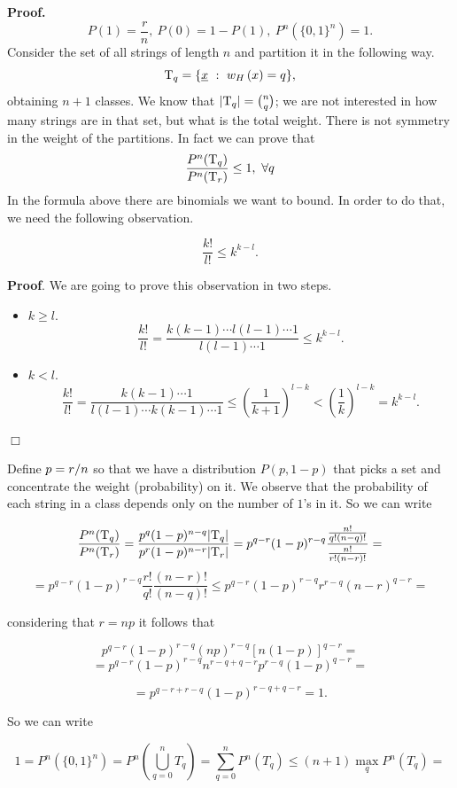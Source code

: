 \noindent\textbf{Proof.} $$P(1) = \dfrac{r}{n},\ P(0) = 1 - P(1),\ P^n(\{0, 1\}^n) = 1.$$
Consider the set of all strings of length $n$ and partition it in the following way.
$$\mathrm{T}_q = \{\underline{x}\ :\ w_H\left(x\right) = q\},$$
obtaining $n +1$ classes. 
We know that $|\mathrm{T}_q| = \binom{n}{q}$; we are not interested in how many strings are in that set, but what is the total weight.
There is not symmetry in the weight of the partitions. In fact we can prove that
$$ \dfrac{P^n(\mathrm{T}_q)}{P^n(\mathrm{T}_r)} \leq 1,\ \forall q$$
In the formula above there are binomials we want to bound. In order to do that, we need the following observation.

\begin{obs}
	$$\dfrac{k!}{l!} \leq k^{k-l}.$$
\end{obs}

\noindent\textbf{Proof}. We are going to prove this observation in two steps.
\begin{itemize}
	\item $k \geq l$. 
	$$\dfrac{k!}{l!} = \dfrac{k(k-1) \cdots l(l -1) \cdots 1}{l(l -1) \cdots 1} \leq k^{k-l}.$$
	
	\item $k < l$.
	$$\dfrac{k!}{l!} = \dfrac{k(k-1) \cdots 1}{l(l -1) \cdots k(k-1) \cdots 1} \leq \left(\dfrac{1}{k+1}\right)^{l-k} < \left(\dfrac{1}{k}\right)^{l-k} = k^{k-l}.$$
\end{itemize}
\hfill$\Box$

Define $p = {r}/{n}$  so that we have a distribution $P(p, 1-p)$ that picks a set and concentrate the weight (probability) on it. We observe that the probability of each string in a class depends only on the number of $1$'s in it. So we can write

\[\dfrac{P^n(\mathrm{T}_q)}{P^n(\mathrm{T}_r)} = \dfrac{p^q(1-p)^{n-q}|\mathrm{T}_q|}{p^r(1-p)^{n-r}|\mathrm{T}_r|} = p^{q-r}(1-p)^{r-q} \dfrac{\frac{n!}{q!(n-q)!}}{\frac{n!}{r!(n-r)!}} = \]
\[ = p^{q-r}(1-p)^{r-q}\dfrac{r!}{q!}\dfrac{(n-r)!}{(n-q)!} \leq p^{q-r}(1-p)^{r-q}r^{r-q}(n-r)^{q-r} = \]

considering that $r = np$ it follows that

\[p^{q-r}(1-p)^{r-q} (np)^{r-q}[n(1-p)]^{q-r}= \] \[ = p^{q-r}(1-p)^{r-q}n^{r-q+q-r}p^{r-q}(1-p)^{q-r} = \]

\[ = p^{q-r + r-q}(1-p)^{r-q+q-r} = 1.\]

So we can write

\[1 = P^n(\{0,1\}^n) = P^n\left(\bigcup_{q=0}^nT_q\right) = \sum_{q=0}^nP^n(T_q)\leq(n+1) \max_qP^n(T_q) = \]

